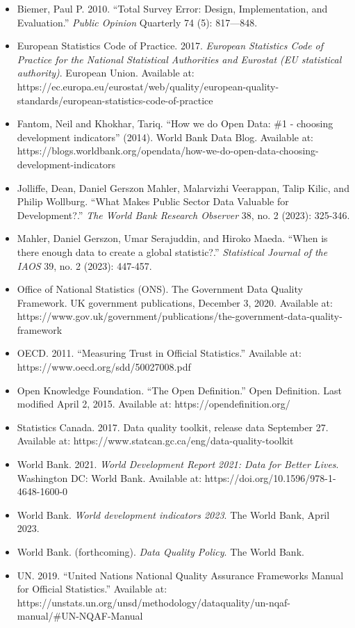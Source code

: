 \documentclass[
  11pt,
  a4paper,
  DIV=11,
  numbers=noendperiod]{scrreprt}
\providecommand{\tightlist}{%
  \setlength{\itemsep}{0pt}\setlength{\parskip}{0pt}}\usepackage{longtable,booktabs,array}
\begin{document}
\begin{itemize}
\tightlist
\item
  Biemer, Paul P. 2010. ``Total Survey Error: Design, Implementation,
  and Evaluation.'' \emph{Public Opinion} Quarterly 74 (5): 817---848.
\item
  European Statistics Code of Practice. 2017. \emph{European Statistics
  Code of Practice for the National Statistical Authorities and Eurostat
  (EU statistical authority)}. European Union. Available at:
  https://ec.europa.eu/eurostat/web/quality/european-quality-standards/european-statistics-code-of-practice
\item
  Fantom, Neil and Khokhar, Tariq. ``How we do Open Data: \#1 - choosing
  development indicators'' (2014). World Bank Data Blog. Available at:
  https://blogs.worldbank.org/opendata/how-we-do-open-data-choosing-development-indicators
\item
  Jolliffe, Dean, Daniel Gerszon Mahler, Malarvizhi Veerappan, Talip
  Kilic, and Philip Wollburg. ``What Makes Public Sector Data Valuable
  for Development?.'' \emph{The World Bank Research Observer} 38, no. 2
  (2023): 325-346.
\item
  Mahler, Daniel Gerszon, Umar Serajuddin, and Hiroko Maeda. ``When is
  there enough data to create a global statistic?.'' \emph{Statistical
  Journal of the IAOS} 39, no. 2 (2023): 447-457.
\item
  Office of National Statistics (ONS). The Government Data Quality
  Framework. UK government publications, December 3, 2020. Available at:
  https://www.gov.uk/government/publications/the-government-data-quality-framework
\item
  OECD. 2011. ``Measuring Trust in Official Statistics.'' Available at:
  https://www.oecd.org/sdd/50027008.pdf
\item
  Open Knowledge Foundation. ``The Open Definition.'' Open Definition.
  Last modified April 2, 2015. Available at: https://opendefinition.org/
\item
  Statistics Canada. 2017. Data quality toolkit, release data September
  27. Available at: https://www.statcan.gc.ca/eng/data-quality-toolkit
\item
  World Bank. 2021. \emph{World Development Report 2021: Data for Better
  Lives}. Washington DC: World Bank. Available at:
  https://doi.org/10.1596/978-1-4648-1600-0
\item
  World Bank. \emph{World development indicators 2023}. The World Bank,
  April 2023.
\item
  World Bank. (forthcoming). \emph{Data Quality Policy}. The World Bank.
\item
  UN. 2019. ``United Nations National Quality Assurance Frameworks
  Manual for Official Statistics.'' Available at:
  https://unstats.un.org/unsd/methodology/dataquality/un-nqaf-manual/\#UN-NQAF-Manual
\end{itemize}
\end{document}
